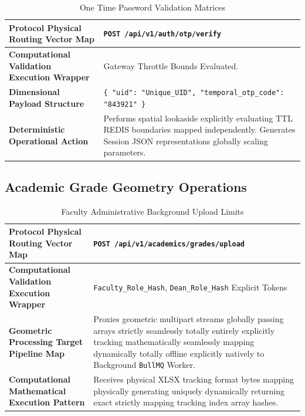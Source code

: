 \documentclass[journal,onecolumn,10pt,draftclsnofoot]{IEEEtran}
\begin{document}
\begin{table}[H]
\centering
\caption{One Time Password Validation Matrices}
\label{tab:apis_otp}
\renewcommand{\arraystretch}{1.6}
\begin{tabularx}{\linewidth}{@{} l X @{}}
\toprule
\textbf{Protocol Physical Routing Vector Map} & \texttt{POST /api/v1/auth/otp/verify} \\
\midrule
\textbf{Computational Validation Execution Wrapper} & Gateway Throttle Bounds Evaluated. \\
\textbf{Dimensional Payload Structure} & \texttt{\{ "uid": "Unique\_UID", "temporal\_otp\_code": "843921" \}} \\
\textbf{Deterministic Operational Action} & Performs spatial lookaside explicitly evaluating TTL REDIS boundaries mapped independently. Generates Session JSON representations globally scaling parameters. \\
\bottomrule
\end{tabularx}
\end{table}

\subsection{Academic Grade Geometry Operations}

\begin{table}[H]
\centering
\caption{Faculty Administrative Background Upload Limits}
\label{tab:apis2}
\renewcommand{\arraystretch}{1.6}
\begin{tabularx}{\linewidth}{@{} l X @{}}
\toprule
\textbf{Protocol Physical Routing Vector Map} & \texttt{POST /api/v1/academics/grades/upload} \\
\midrule
\textbf{Computational Validation Execution Wrapper} & \texttt{Faculty\_Role\_Hash}, \texttt{Dean\_Role\_Hash} Explicit Tokens \\
\textbf{Geometric Processing Target Pipeline Map} & Proxies geometric multipart streams globally passing arrays strictly seamlessly totally entirely explicitly tracking mathematically seamlessly mapping dynamically totally offline explicitly natively to Background \texttt{BullMQ} Worker. \\
\textbf{Computational Mathematical Execution Pattern} & Receives physical XLSX tracking format bytes mapping physically generating uniquely dynamically returning exact strictly mapping tracking index array hashes. \\
\bottomrule
\end{tabularx}
\end{table}
\end{document}
